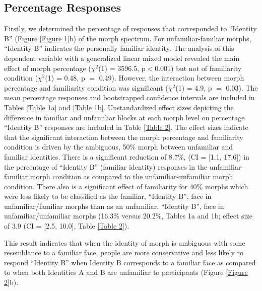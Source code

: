 \documentclass[10pt,letterpaper]{article}
\begin{document}
\subsection*{Percentage Responses}
Firstly, we determined the percentage of responses that corresponded to “Identity B” (Figure \ref{Figure 1}b) of the morph spectrum. For unfamiliar-familiar morphs, “Identity B” indicates the personally familiar identity. The analysis of this dependent variable with a generalized linear mixed model revealed the main effect of morph percentage (\( \chi^2 \)(1) = 3596.5, p$<$0.001) but not of familiarity condition (\( \chi^2 \)(1) = 0.48, p $=$ 0.49). However, the interaction between morph percentage and familiarity condition was significant (\( \chi^2 \)(1) = 4.9, p $=$ 0.03). The mean percentage responses and bootstrapped confidence intervals are included in Tables \ref{Table 1a} and \ref{Table 1b}. Unstandardized effect sizes depicting the difference in familiar and unfamiliar blocks at each morph level on percentage “Identity B” responses are included in Table \ref{Table 2}. The effect sizes indicate that the significant interaction between the morph percentage and familiarity condition is driven by the ambiguous, 50\% morph between unfamiliar and familiar identities. There is a significant reduction of 8.7\%, (CI = [1.1, 17.6]) in the percentage of “Identity B” (familiar identity) responses in the unfamiliar-familiar morph condition as compared to the unfamiliar-unfamiliar morph condition. There also is a significant effect of familiarity for 40\% morphs which were less likely to be classified as the familiar, “Identity B”, face in unfamiliar/familiar morphs than as an unfamiliar, “Identity B”, face in unfamiliar/unfamiliar morphs (16.3\% versus 20.2\%, Tables 1a and 1b; effect size of 3.9 (CI = [2.5, 10.0], Table \ref{Table 2}).

This result indicates that when the identity of morph is ambiguous with some resemblance to a familiar face, people are more conservative and less likely to respond “Identity B” when Identity B corresponds to a familiar face as compared to when both Identities A and B are unfamiliar to participants (Figure \ref{Figure 2}b). 
\end{document}
